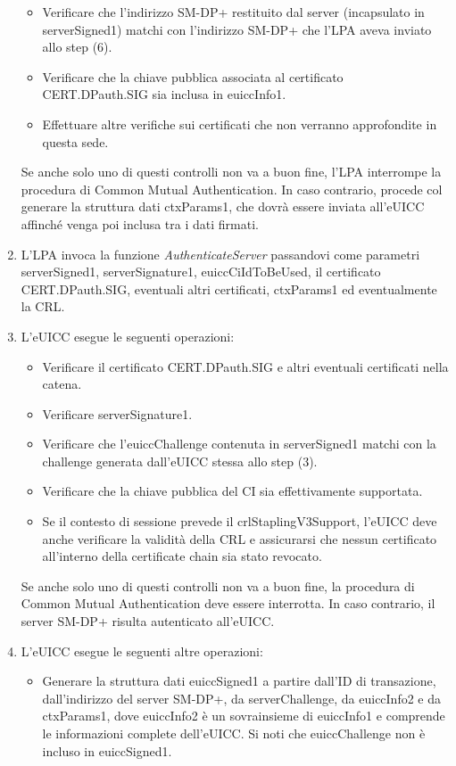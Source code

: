 \documentclass[10pt, twoside, openany]{book}
\begin{document}
\begin{enumerate}
\begin{itemize}[itemsep=0pt]
\item Verificare che l'indirizzo SM-DP+ restituito dal server (incapsulato in serverSigned1) matchi con l'indirizzo SM-DP+ che l'LPA aveva inviato allo step (6).
\item Verificare che la chiave pubblica associata al certificato CERT.DPauth.SIG sia inclusa in euiccInfo1.
\item Effettuare altre verifiche sui certificati che non verranno approfondite in questa sede.
\end{itemize}
Se anche solo uno di questi controlli non va a buon fine, l'LPA interrompe la procedura di Common Mutual Authentication. In caso contrario, procede col generare la struttura dati ctxParams1, che dovrà essere inviata all'eUICC affinché venga poi inclusa tra i dati firmati.
\item L'LPA invoca la funzione \textit{AuthenticateServer} passandovi come parametri serverSigned1, serverSignature1, euiccCiIdToBeUsed, il certificato CERT.DPauth.SIG, eventuali altri certificati, ctxParams1 ed eventualmente la CRL.
\item L'eUICC esegue le seguenti operazioni:
\begin{itemize}[itemsep=0pt]
\item Verificare il certificato CERT.DPauth.SIG e altri eventuali certificati nella catena.
\item Verificare serverSignature1.
\item Verificare che l'euiccChallenge contenuta in serverSigned1 matchi con la challenge generata dall'eUICC stessa allo step (3).
\item Verificare che la chiave pubblica del CI sia effettivamente supportata.
\item Se il contesto di sessione prevede il crlStaplingV3Support, l'eUICC deve anche verificare la validità della CRL e assicurarsi che nessun certificato all'interno della certificate chain sia stato revocato.
\end{itemize}
Se anche solo uno di questi controlli non va a buon fine, la procedura di Common Mutual Authentication deve essere interrotta. In caso contrario, il server SM-DP+ risulta autenticato all'eUICC.
\item L'eUICC esegue le seguenti altre operazioni:
\begin{itemize}[itemsep=0pt]
\item Generare la struttura dati euiccSigned1 a partire dall'ID di transazione, dall'indirizzo del server SM-DP+, da serverChallenge, da euiccInfo2 e da ctxParams1, dove euiccInfo2 è un sovrainsieme di euiccInfo1 e comprende le informazioni complete dell'eUICC. Si noti che euiccChallenge non è incluso in euiccSigned1.

\end{itemize}
\end{enumerate}
\end{document}
